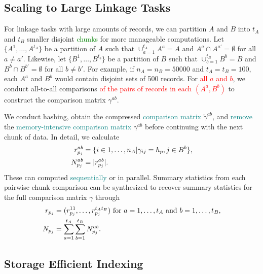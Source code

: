 \documentclass[ba]{imsart}
\begin{document}
\hypertarget{scaling}{%
	\subsection{Scaling to Large Linkage Tasks}\label{scaling}}

		For linkage tasks with large amounts of records, we can partition $A$ and $B$ into $t_A$ and $t_B$ smaller disjoint \textcolor{green}{chunks} for more manageable computations. Let $\{A^1, \dots, A^{t_A}\}$ be a partition of $A$ such that $\cup_{a=1}^{t_A} A^a = A$ and $A^a \cap A^{a'}=\emptyset$ for all $a \neq a'$.  Likewise, let $\{B^1, \dots, B^{t_b}\}$ be a partition of $B$ such that $\cup_{b=1}^{t_B} B^b = B$ and $B^b \cap B^{b'}=\emptyset$ for all $b \neq b'$.  For example, if $n_A = n_B = 50000$ and $t_A = t_B = 100$, each $A^a$ and $B^b$ would contain disjoint sets of 500 records. For \textcolor{red}{all $a$ and $b$}, we conduct all-to-all comparisons \textcolor{red}{of the pairs of records in each $(A^a, B^b)$} to construct the comparison matrix $\gamma^{ab}$. 
		
		We conduct hashing, obtain the compressed \textcolor{teal}{comparison matrix} $\tilde{\gamma}^{ab}$, and \textcolor{teal}{remove}
		the 
\textcolor{teal}{memory-intensive}
		\textcolor{teal}{comparison matrix} $\gamma^{ab}$ 
		before continuing with the next chunk of data. 
		In detail, we calculate
\begin{subequations}
	\begin{align}
		r_{p_j}^{ab} &= \{i \in 1, \dots, n_A| \gamma_{ij} = h_p, j \in B^b\}, \label{r_{p_j}^{ab}} \\
		N_{p_j}^{ab} &= |r_{p_j}^{ab}|. \label{N_{p_j}^{ab}}
	\end{align}
\end{subequations}
These can computed \textcolor{teal}{sequentially} or in parallel. Summary statistics from each pairwise chunk comparison can be synthesized to recover summary statistics for the full comparison matrix $\gamma$ through
\begin{subequations}
	\begin{align}
		r_{p_j} &= (r_{p_j}^{11}, \ldots, r_{p_j}^{ t_A t_B}) \text{ for } a = 1, \ldots, t_A \text{ and } b = 1, \ldots, t_B, \label{r_{p_j}} \\
		N_{p_j} &= \sum_{a = 1}^{t_A} \sum_{b = 1}^{t_B} N_{p_j}^{ab}.\label{N_{p_j}}	\end{align}
\end{subequations} 

\hypertarget{SEI}{%
	\subsection{Storage Efficient Indexing}\label{SEI}}
\end{document}

